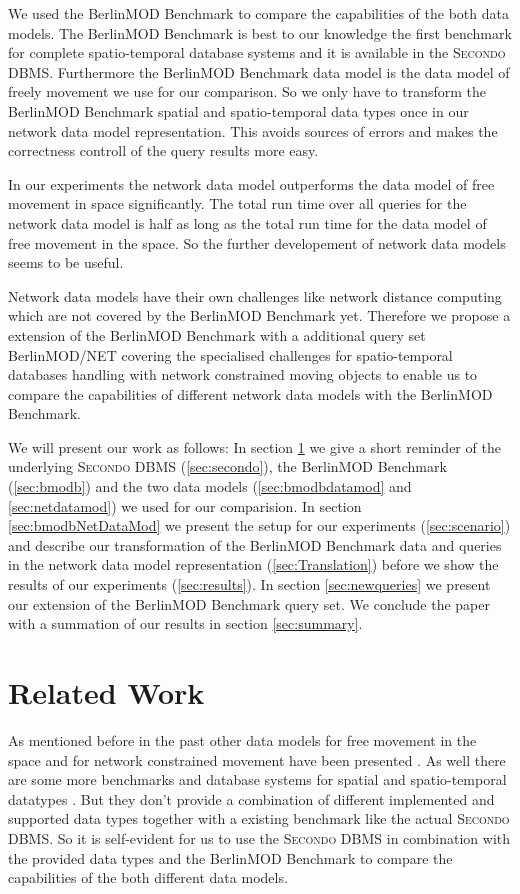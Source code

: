 \documentclass[a4paper]{article}
\newcommand{\secondo}{\textsc{Secondo}}
\newcommand{\bmodb} {BerlinMOD Benchmark}
\begin{document}
We used the \bmodb{} \cite{BerlinMODVLDB} to compare the capabilities of the
both data models. The \bmodb{} is best to our knowledge the first benchmark for
complete spatio-temporal database systems and it is available in the \secondo{}
 DBMS. Furthermore the \bmodb{} data model is the data model of freely movement
we use for our comparison. So we only have to transform the \bmodb{} spatial and
 spatio-temporal data types once in our network data model representation. This
avoids sources of errors and makes the correctness controll of the query results
 more easy.

In our experiments the network data model outperforms the data model of free
movement in space significantly. The total run time over all queries for the
network data model is half as long as the total run time for the data model of
free movement in the space. So the further developement of network data models
seems to be useful.

Network data models have their own challenges like network distance computing
which are not covered by the \bmodb{} yet. Therefore we propose a extension of
the \bmodb{} with a additional query set BerlinMOD/NET covering the specialised
challenges for spatio-temporal databases handling with network constrained moving
objects to enable us to compare the capabilities of different network data models
with the \bmodb{}.

We will present our work as follows: In section \ref{sec:relWork} we give a
short reminder of the underlying \secondo{} DBMS (\ref{sec:secondo}), the \bmodb{} (\ref{sec:bmodb}) and the two data models (\ref{sec:bmodbdatamod}
 and \ref{sec:netdatamod}) we used for our comparision. In section
\ref{sec:bmodbNetDataMod} we present the setup for our experiments (\ref{sec:scenario})
 and describe our transformation of the \bmodb{} data and queries in the network
 data model representation (\ref{sec:Translation}) before we show the results of
our experiments (\ref{sec:results}). In section \ref{sec:newqueries} we present
 our extension of the \bmodb{} query set. We conclude the paper with a summation
 of our results in section \ref{sec:summary}.
\section{Related Work}
\label{sec:relWork}
As mentioned before in the past other data models for free movement in the space \cite{335426,chenzaniolosqlst} and for network constrained movement have been
presented \cite{1146465,956692,VazWolfNetMod}. As well there are some more
benchmarks \cite{COSTBenchmark, QueriesTheodoridis} and database systems for
spatial and spatio-temporal datatypes \cite{HERMES,1054151}. But they don't
provide a combination of different implemented and supported data types together
 with a existing benchmark like the actual \secondo{} DBMS. So it is self-evident
for us to use the \secondo{} DBMS in combination with the provided data types and
the \bmodb{} to compare the capabilities of the both different data models.
\end{document}
